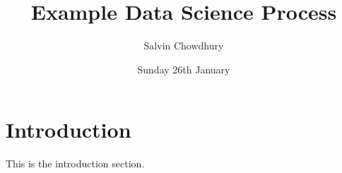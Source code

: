 \documentclass{article}
\title{\raggedleft Example Data Science Process}
\author{Salvin Chowdhury}
\date{Sunday 26th January}
\begin{document}
\maketitle  %

\section{Introduction}
This is the introduction section.
\end{document}
